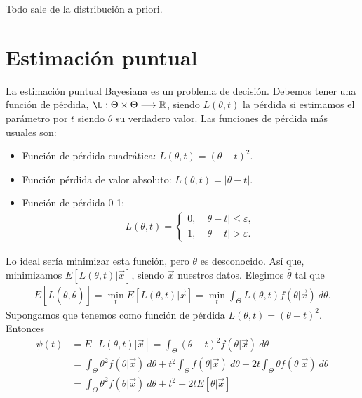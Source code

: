 \begin{tcolorbox}[title=Regla de Oro]
Todo sale de la distribución a priori.
\end{tcolorbox}

\section{Estimación puntual}
\noindent La estimación puntual Bayesiana es un problema de decisión. Debemos tener una función de pérdida, $\L : \Theta \times \Theta \longrightarrow \mathbb{R}$, siendo $L(\theta,t)$ la pérdida si estimamos el parámetro por $t$ siendo $\theta$ su verdadero valor. Las funciones de pérdida más usuales son:
\begin{itemize}
    \item Función de pérdida cuadrática: $L(\theta,t) = (\theta - t)^2$.
    \item Función pérdida de valor absoluto: $L(\theta,t) = |\theta - t|$.
    \item Función de pérdida 0-1: 
    \begin{align*}
        L(\theta,t) = \begin{cases}
            0, & |\theta - t| \leq \varepsilon, \\
            1, & |\theta - t| > \varepsilon.
        \end{cases}
    \end{align*}
\end{itemize}
Lo ideal sería minimizar esta función, pero $\theta$ es desconocido. Así que, minimizamos $E[L(\theta,t) | \vec{x}]$, siendo $\vec{x}$ nuestros datos. Elegimos $\widehat{\theta}$ tal que
\begin{align*}
    E[L(\theta, \widehat{\theta})] = \min_{t} E[L(\theta,t) | \vec{x}] = \min_t \int_{\Theta} L(\theta,t) f(\theta | \vec{x}) \ d\theta.
\end{align*}
\noindent Supongamos que tenemos como función de pérdida $L(\theta,t) = (\theta - t)^2$. Entonces
\begin{align*}
    \psi(t) &= E[L(\theta,t) | \vec{x}] = \int_{\Theta} (\theta - t)^2 f(\theta | \vec{x}) \ d\theta \\
    &= \int_{\Theta} \theta^2 f(\theta | \vec{x}) \ d\theta + t^2 \int_{\Theta} f(\theta | \vec{x}) \ d\theta - 2t \int_{\Theta} \theta f(\theta | \vec{x}) \ d\theta \\
    &= \int_{\Theta} \theta^2 f(\theta | \vec{x}) \ d\theta + t^2 - 2tE[\theta | \vec{x}]
\end{align*}
